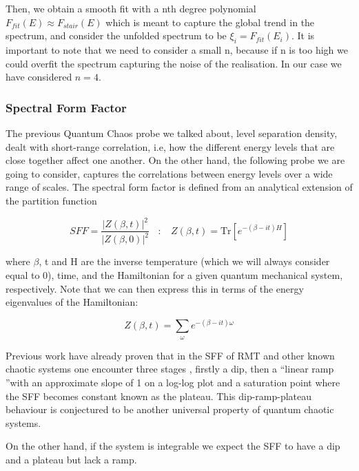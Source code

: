 \documentclass[11pt,a4paper]{article}
\begin{document}
Then, we obtain a smooth fit with a nth degree polynomial $F_{fit}(E)\approx F_{stair}(E)$ which is meant to capture the global trend in the spectrum, and consider the unfolded spectrum to be $\xi_i = F_{fit}(E_i)$. It is important to note that we need to consider a small n, because if n is too high we could overfit the spectrum capturing the noise of the realisation. In our case we have considered $n=4$.

\subsubsection{Spectral Form Factor}

The previous Quantum Chaos probe we talked about, level separation density, dealt with short-range correlation, i.e, how the different energy levels that are close together affect one another. On the other hand, the following probe we are going to consider, captures the correlations between energy levels over a wide range of scales. The spectral form factor is defined from an analytical extension of the partition function

\begin{equation}
    SFF = \frac{\left|Z(\beta,t)\right|^2}{|Z(\beta,0)|^2} ~~~~:~~~~ Z(\beta,t) = \text{Tr}\left[e^{-(\beta-it)H}\right]
\end{equation}

{\noindent where $\beta$, t and H are the inverse temperature (which we will always consider equal to 0), time, and the Hamiltonian for a given quantum mechanical system, respectively. Note that we can then express this in terms of the energy eigenvalues of the Hamiltonian:}

\begin{equation}
    Z(\beta,t) = \sum_\omega e^{-(\beta-it)\omega}
\end{equation}

Previous work \cite{cotler_black_2017,PhysRevE.55.4067,Martinez_Azcona_2025} have already proven that in the SFF of RMT and other known chaotic systems one encounter three stages , firstly a dip, then a \textquotedblleft linear ramp \textquotedblright with an approximate slope of 1 on a log-log plot and a saturation point where the SFF becomes constant known as the plateau. This dip-ramp-plateau behaviour is conjectured to be another universal property of quantum chaotic systems.

On the other hand, if the system is integrable we expect the SFF to have a dip and a plateau but lack a ramp.
\end{document}
